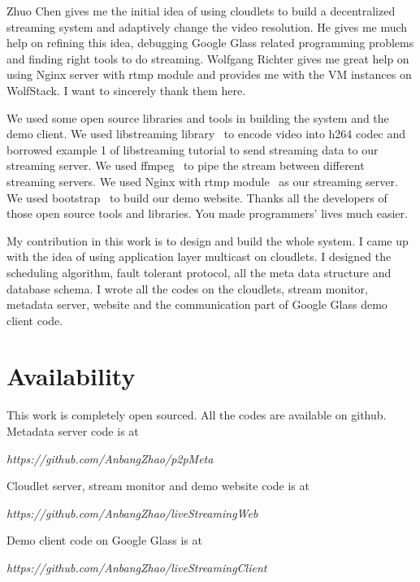 \documentclass[letterpaper,twocolumn,10pt]{article}
\begin{document}
Zhuo Chen gives me the initial idea of using cloudlets to build a decentralized streaming system and adaptively change the video resolution. He gives me much help on refining this idea, debugging Google Glass related programming problems and finding right tools to do streaming. Wolfgang Richter gives me great help on using Nginx server with rtmp module and provides me with the VM instances on WolfStack. I want to sincerely thank them here.

We used some open source libraries and tools in building the system and the demo client. We used libstreaming library~\cite{libstreaming} to encode video into h264 codec and borrowed example 1 of libstreaming tutorial to send streaming data to our streaming server. We used ffmpeg~\cite{tomar2006converting} to pipe the stream between different streaming servers. We used Nginx with rtmp module~\cite{nginx} as our streaming server. We used bootstrap~\cite{bootstrap} to build our demo website. Thanks all the developers of those open source tools and libraries. You made programmers' lives much easier.

My contribution in this work is to design and build the whole system. I came up with the idea of using application layer multicast on cloudlets. I designed the scheduling algorithm, fault tolerant protocol, all the meta data structure and database schema. I wrote all the codes on the cloudlets, stream monitor, metadata server, website and the communication part of Google Glass demo client code.

\section{Availability}

This work is completely open sourced. All the codes are available on github. Metadata server code is at

\begin{center}
 \emph {https://github.com/AnbangZhao/p2pMeta}\\
\end{center}

Cloudlet server, stream monitor and demo website code is at
\begin{center}
\emph {https://github.com/AnbangZhao/liveStreamingWeb}\\
\end{center}

Demo client code on Google Glass is at
\begin{center}
\emph {https://github.com/AnbangZhao/liveStreamingClient}\\
\end{center}


{\footnotesize 
}
\end{document}
